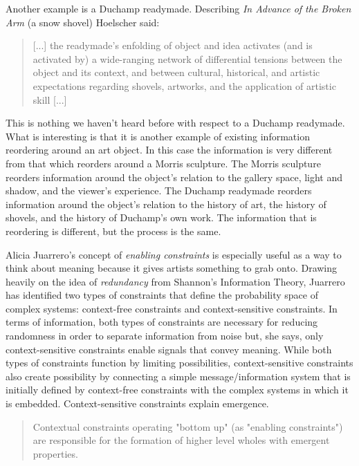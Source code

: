 \documentclass[letterpaper]{article}
\begin{document}
    Another example is a Duchamp readymade. Describing \emph{In Advance of the Broken Arm} (a snow shovel) Hoelscher said:

    \begin{quote}
        [...] the readymade's enfolding of object and idea activates (and is activated by) a wide-ranging network of differential tensions between the object and its context, and between cultural, historical, and artistic expectations regarding shovels, artworks, and the application of artistic skill [...]
    \end{quote}

    This is nothing we haven't heard before with respect to a Duchamp readymade. What is interesting is that it is another example of existing information reordering around an art object. In this case the information is very different from that which reorders around a Morris sculpture. The Morris sculpture reorders information around the object's relation to the gallery space, light and shadow, and the viewer's experience. The Duchamp readymade reorders information around the object's relation to the history of art, the history of shovels, and the history of Duchamp's own work. The information that is reordering is different, but the process is the same.

    Alicia Juarrero's concept of \emph{enabling constraints} is especially useful as a way to think about meaning because it gives artists something to grab onto.  Drawing heavily on the idea of \emph{redundancy} from Shannon's Information Theory, Juarrero has identified two types of constraints that define the probability space of complex systems: context-free constraints and context-sensitive constraints. In terms of information, both types of constraints are necessary for reducing randomness in order to separate information from noise but, she says, only context-sensitive constraints enable signals that convey meaning. While both types of constraints function by limiting possibilities, context-sensitive constraints also create possibility by connecting a simple message/information system that is initially defined by context-free constraints with the complex systems in which it is embedded. Context-sensitive constraints explain emergence.

    \begin{quote}
        Contextual constraints operating "bottom up" (as "enabling constraints") are responsible for the formation of higher level wholes with emergent properties. \citep[p.240]{JuarreroCsltyAsCnstrnt1998}
    \end{quote}
\end{document}
